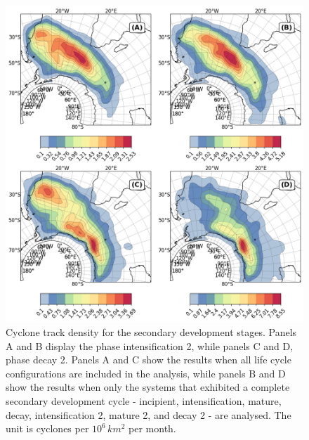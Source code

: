 \begin{figure}[!htbp]
\centering
\includegraphics[width=\textwidth]{figs_4/density_map_secondary_development_combined.png}
\caption[Track Density - Secondary Development Stages]{Cyclone track density for the secondary development stages. Panels A and B display the phase intensification 2, while panels C and D, phase decay 2. Panels A and C show the results when all life cycle configurations are included in the analysis, while panels B and D show the results when only the systems that exhibited a complete secondary development cycle - incipient, intensification, mature, decay, intensification 2, mature 2, and decay 2 - are analysed. The unit is cyclones per \(10^6 \, km^2\) per month.}
\label{fig:secondary_development_combined}
\end{figure}

